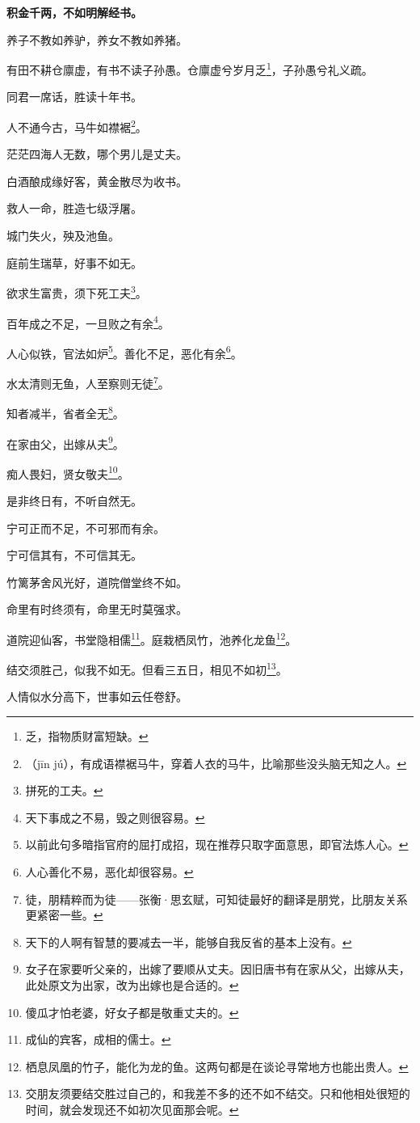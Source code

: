 \documentclass[12pt,oneside]{book}
\begin{document}
\textbf{积金千两，不如明解经书。}

养子不教如养驴，养女不教如养猪。

有田不耕仓廪虚，有书不读子孙愚。仓廪虚兮岁月乏\footnote{乏，指物质财富短缺。}，子孙愚兮礼义疏。

同君一席话，胜读十年书。

人不通今古，马牛如襟裾\footnote{（jīn jú），有成语襟裾马牛，穿着人衣的马牛，比喻那些没头脑无知之人。}。

茫茫四海人无数，哪个男儿是丈夫。

白酒酿成缘好客，黄金散尽为收书。

救人一命，胜造七级浮屠。

城门失火，殃及池鱼。

庭前生瑞草，好事不如无。

欲求生富贵，须下死工夫\footnote{拼死的工夫。}。

百年成之不足，一旦败之有余\footnote{天下事成之不易，毁之则很容易。}。

人心似铁，官法如炉\footnote{以前此句多暗指官府的屈打成招，现在推荐只取字面意思，即官法炼人心。}。善化不足，恶化有余\footnote{人心善化不易，恶化却很容易。}。

水太清则无鱼，人至察则无徒\footnote{徒，朋精粹而为徒——张衡·思玄赋，可知徒最好的翻译是朋党，比朋友关系更紧密一些。}。

知者减半，省者全无\footnote{天下的人啊有智慧的要减去一半，能够自我反省的基本上没有。}。

在家由父，出嫁从夫\footnote{女子在家要听父亲的，出嫁了要顺从丈夫。因旧唐书有在家从父，出嫁从夫，此处原文为出家，改为出嫁也是合适的。}。

痴人畏妇，贤女敬夫\footnote{傻瓜才怕老婆，好女子都是敬重丈夫的。}。

是非终日有，不听自然无。

宁可正而不足，不可邪而有余。

宁可信其有，不可信其无。

竹篱茅舍风光好，道院僧堂终不如。

命里有时终须有，命里无时莫强求。

道院迎仙客，书堂隐相儒\footnote{成仙的宾客，成相的儒士。}。庭栽栖凤竹，池养化龙鱼\footnote{栖息凤凰的竹子，能化为龙的鱼。这两句都是在谈论寻常地方也能出贵人。}。

结交须胜己，似我不如无。但看三五日，相见不如初\footnote{交朋友须要结交胜过自己的，和我差不多的还不如不结交。只和他相处很短的时间，就会发现还不如初次见面那会呢。}。

人情似水分高下，世事如云任卷舒。
\end{document}
